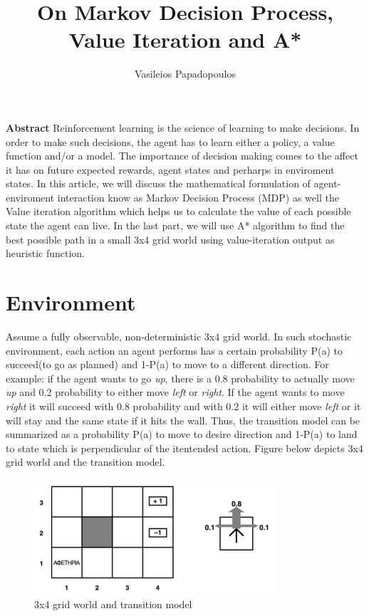\documentclass[10pt,a4paper,twocolumn]{article}
\title{On Markov Decision Process, Value Iteration and A*}
\author{Vasileios Papadopoulos}
\begin{document}
	\maketitle
	
	\textbf{Abstract}
	Reinforcement learning is the science of learning to make decisions. In order to make such decisions, the agent has to learn either a policy,	a value function and/or a model. The importance of decision making comes to the affect it has on future expected rewards, agent states and perharps in enviroment states. In this article, we will discuss the mathematical formulation of agent-enviroment interaction know as Markov Decision Process (MDP) as well the Value iteration algorithm which helps us to calculate the value of each possible state the agent can live. In the last part, we will use A* algorithm to find the best possible path in a small 3x4 grid world using value-iteration output as heuristic function.
	
	
	\section{Environment}
	
	Assume a fully observable, non-deterministic 3x4 grid world. In such stochastic environment, 
	each action an agent performs has a certain probability P(a) to succeed(to go as planned) and 1-P(a) to move to a different direction. 
	For example: if the agent wants to go \textit{up}, there is a 0.8 probability to actually move \textit{up} and 0.2 probability to either move \textit{left} or \textit{right}. If the agent wants to move \textit{right} it will succeed with 0.8 probability and with 0.2 it will either move \textit{left} or it will stay and the same state if it hits the wall. Thus, the transition model can be summarized as a probability P(a) to move to desire direction and 1-P(a) to land to state which is perpendicular of the itentended action. Figure below depicts 3x4 grid world and the transition model.
\begin{figure}[ht!]
	\centering
	\includegraphics[width=90mm]{grid_world}
	\caption{3x4 grid world and transition model \label{overflow}}
\end{figure}
	
\end{document}
